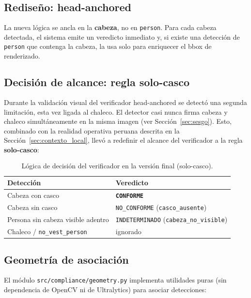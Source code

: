 \documentclass[journal,onecolumn,11pt]{IEEEtran}
\begin{document}
\subsection{Rediseño: head-anchored}

La nueva lógica se ancla en la \textbf{cabeza}, no en
\texttt{person}. Para cada cabeza detectada, el sistema emite un
veredicto inmediato y, si existe una detección de \texttt{person}
que contenga la cabeza, la usa solo para enriquecer el bbox de
renderizado.

\subsection{Decisión de alcance: regla solo-casco}
\label{sec:decision_alcance}

Durante la validación visual del verificador head-anchored se
detectó una segunda limitación, esta vez ligada al chaleco. El
detector casi nunca firma cabeza y chaleco simultáneamente en la
misma imagen (ver Sección~\ref{sec:sesgo}). Esto, combinado con la
realidad operativa peruana descrita en la
Sección~\ref{sec:contexto_local}, llevó a redefinir el alcance del
verificador a la regla \textbf{solo-casco}:

\begin{table}[H]
\centering
\caption{Lógica de decisión del verificador en la versión final
(solo-casco).}
\label{tab:logica_verificador}
\begin{tabular}{p{5cm} l}
\toprule
\textbf{Detección} & \textbf{Veredicto} \\
\midrule
Cabeza con casco & \textbf{\texttt{CONFORME}} \\
Cabeza sin casco & \texttt{NO\_CONFORME} (\texttt{casco\_ausente}) \\
Persona sin cabeza visible adentro & \texttt{INDETERMINADO}
(\texttt{cabeza\_no\_visible}) \\
Chaleco / \texttt{no\_vest\_person} & ignorado \\
\bottomrule
\end{tabular}
\end{table}

\subsection{Geometría de asociación}

El módulo \texttt{src/compliance/geometry.py} implementa utilidades
puras (sin dependencia de OpenCV ni de Ultralytics) para asociar
detecciones:
\end{document}
